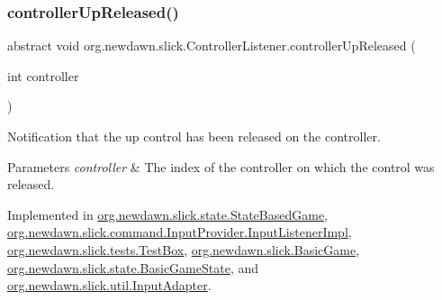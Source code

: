 \mbox{\label{interfaceorg_1_1newdawn_1_1slick_1_1_controller_listener_a1342ad9ad1f7314b4eb10c20c21a9d50}} 
\subsubsection{\texorpdfstring{controller\+Up\+Released()}{controllerUpReleased()}}
{\footnotesize\ttfamily abstract void org.\+newdawn.\+slick.\+Controller\+Listener.\+controller\+Up\+Released (\begin{DoxyParamCaption}\item[{int}]{controller }\end{DoxyParamCaption})\hspace{0.3cm}{\ttfamily [abstract]}}

Notification that the up control has been released on the controller.


\begin{DoxyParams}{Parameters}
{\em controller} & The index of the controller on which the control was released. \\
\hline
\end{DoxyParams}


Implemented in \mbox{\hyperlink{classorg_1_1newdawn_1_1slick_1_1state_1_1_state_based_game_a7b4ef38f15fdd419c18b7bddf6958a04}{org.\+newdawn.\+slick.\+state.\+State\+Based\+Game}}, \mbox{\hyperlink{classorg_1_1newdawn_1_1slick_1_1command_1_1_input_provider_1_1_input_listener_impl_a44338713bf5dfac2e16ced2d29c921bc}{org.\+newdawn.\+slick.\+command.\+Input\+Provider.\+Input\+Listener\+Impl}}, \mbox{\hyperlink{classorg_1_1newdawn_1_1slick_1_1tests_1_1_test_box_ad22f577d725eaa52a02136efa4ca5f95}{org.\+newdawn.\+slick.\+tests.\+Test\+Box}}, \mbox{\hyperlink{classorg_1_1newdawn_1_1slick_1_1_basic_game_a3fc92fc64da3e17cac17c1110d5b7237}{org.\+newdawn.\+slick.\+Basic\+Game}}, \mbox{\hyperlink{classorg_1_1newdawn_1_1slick_1_1state_1_1_basic_game_state_af4be493c79ad2ee89aed6f64b2ebd9fa}{org.\+newdawn.\+slick.\+state.\+Basic\+Game\+State}}, and \mbox{\hyperlink{classorg_1_1newdawn_1_1slick_1_1util_1_1_input_adapter_a78fed236d44ced5cc4fc1b1c093f50fb}{org.\+newdawn.\+slick.\+util.\+Input\+Adapter}}.

